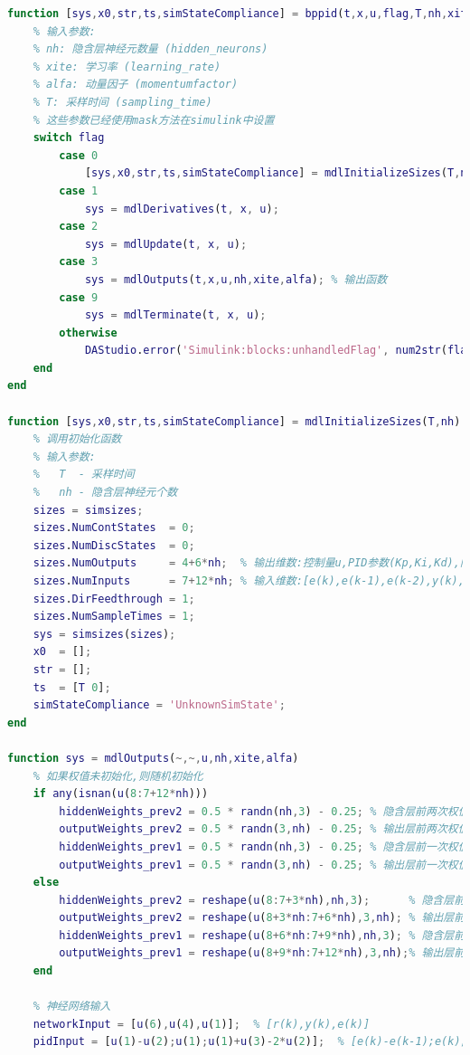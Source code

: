 \documentclass[12pt,a4paper,UTF8]{article}
\begin{document}
\begin{lstlisting}[language=Matlab,caption=BPD-PID控制器实现]
    function [sys,x0,str,ts,simStateCompliance] = bppid(t,x,u,flag,T,nh,xite,alfa)
    % 输入参数:
    % nh: 隐含层神经元数量 (hidden_neurons)
    % xite: 学习率 (learning_rate)
    % alfa: 动量因子 (momentumfactor)
    % T: 采样时间 (sampling_time)
    % 这些参数已经使用mask方法在simulink中设置
    switch flag
        case 0
            [sys,x0,str,ts,simStateCompliance] = mdlInitializeSizes(T,nh); % 初始化函数
        case 1
            sys = mdlDerivatives(t, x, u);
        case 2
            sys = mdlUpdate(t, x, u);
        case 3
            sys = mdlOutputs(t,x,u,nh,xite,alfa); % 输出函数
        case 9
            sys = mdlTerminate(t, x, u);
        otherwise
            DAStudio.error('Simulink:blocks:unhandledFlag', num2str(flag));
    end
end

function [sys,x0,str,ts,simStateCompliance] = mdlInitializeSizes(T,nh)
    % 调用初始化函数
    % 输入参数:
    %   T  - 采样时间
    %   nh - 隐含层神经元个数
    sizes = simsizes;
    sizes.NumContStates  = 0;
    sizes.NumDiscStates  = 0;
    sizes.NumOutputs     = 4+6*nh;  % 输出维数:控制量u,PID参数(Kp,Ki,Kd),隐含层和输出层权值
    sizes.NumInputs      = 7+12*nh; % 输入维数:[e(k),e(k-1),e(k-2),y(k),y(k-1),r(k),u(k-1)],前后两次权值
    sizes.DirFeedthrough = 1;
    sizes.NumSampleTimes = 1;
    sys = simsizes(sizes);
    x0  = [];
    str = [];
    ts  = [T 0];
    simStateCompliance = 'UnknownSimState';
end

function sys = mdlOutputs(~,~,u,nh,xite,alfa)
    % 如果权值未初始化,则随机初始化
    if any(isnan(u(8:7+12*nh)))
        hiddenWeights_prev2 = 0.5 * randn(nh,3) - 0.25; % 隐含层前两次权值(k-2)
        outputWeights_prev2 = 0.5 * randn(3,nh) - 0.25; % 输出层前两次权值(k-2) 
        hiddenWeights_prev1 = 0.5 * randn(nh,3) - 0.25; % 隐含层前一次权值(k-1)
        outputWeights_prev1 = 0.5 * randn(3,nh) - 0.25; % 输出层前一次权值(k-1)
    else
        hiddenWeights_prev2 = reshape(u(8:7+3*nh),nh,3);      % 隐含层前两次权值矩阵(nh×3)
        outputWeights_prev2 = reshape(u(8+3*nh:7+6*nh),3,nh); % 输出层前两次权值矩阵(3×nh)
        hiddenWeights_prev1 = reshape(u(8+6*nh:7+9*nh),nh,3); % 隐含层前一次权值矩阵(nh×3)
        outputWeights_prev1 = reshape(u(8+9*nh:7+12*nh),3,nh);% 输出层前一次权值矩阵(3×nh)
    end
    
    % 神经网络输入
    networkInput = [u(6),u(4),u(1)];  % [r(k),y(k),e(k)]
    pidInput = [u(1)-u(2);u(1);u(1)+u(3)-2*u(2)];  % [e(k)-e(k-1);e(k);e(k)+e(k-2)-2*e(k-1)]
    

\end{lstlisting}
\end{document}
